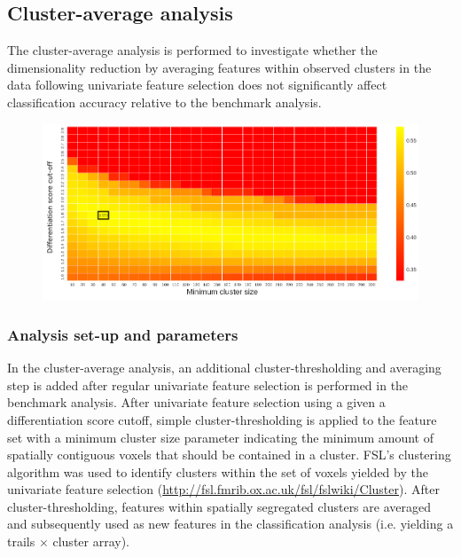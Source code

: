 \documentclass[jou,12pt,a4paper]{apa6}
\begin{document}
{%
\subsection{Cluster-average analysis}
\noindent The cluster-average analysis is performed to investigate whether the dimensionality reduction by averaging features within observed clusters in the data following univariate feature selection does not significantly affect classification accuracy relative to the benchmark analysis.

\begin{figure}[ht]
\centering
\includegraphics[width=\textwidth]{gridsearch_clustercorrect}
\end{figure}

\subsubsection{Analysis set-up and parameters}
\noindent In the cluster-average analysis, an additional cluster-thresholding and averaging step is added after regular univariate feature selection is performed in the benchmark analysis. After univariate feature selection using a given a differentiation score cutoff, simple cluster-thresholding is applied to the feature set with a minimum cluster size parameter indicating the minimum amount of spatially contiguous voxels that should be contained in a cluster. FSL's clustering algorithm was used to identify clusters within the set of voxels yielded by the univariate feature selection (\url{http://fsl.fmrib.ox.ac.uk/fsl/fslwiki/Cluster}). After cluster-thresholding, features within spatially segregated clusters are averaged and subsequently used as new features in the classification analysis (i.e. yielding a trails $\times$ cluster array).  

}
\end{document}
